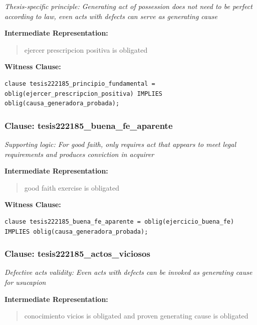 \documentclass[11pt,a4paper]{article}
\begin{document}
\textit{Thesis-specific principle: Generating act of possession does not need to be perfect according to law, even acts with defects can serve as generating cause}

\textbf{Intermediate Representation:}

\begin{quote}
ejercer prescripcion positiva is obligated
\end{quote}

\textbf{Witness Clause:}

\begin{lstlisting}[style=witnessstyle, language=Witness]
clause tesis222185_principio_fundamental = oblig(ejercer_prescripcion_positiva) IMPLIES oblig(causa_generadora_probada);
\end{lstlisting}

\subsubsection{Clause: tesis222185\_buena\_fe\_aparente}

\textit{Supporting logic: For good faith, only requires act that appears to meet legal requirements and produces conviction in acquirer}

\textbf{Intermediate Representation:}

\begin{quote}
good faith exercise is obligated
\end{quote}

\textbf{Witness Clause:}

\begin{lstlisting}[style=witnessstyle, language=Witness]
clause tesis222185_buena_fe_aparente = oblig(ejercicio_buena_fe) IMPLIES oblig(causa_generadora_probada);
\end{lstlisting}

\subsubsection{Clause: tesis222185\_actos\_viciosos}

\textit{Defective acts validity: Even acts with defects can be invoked as generating cause for usucapion}

\textbf{Intermediate Representation:}

\begin{quote}
conocimiento vicios is obligated and proven generating cause is obligated
\end{quote}
\end{document}

